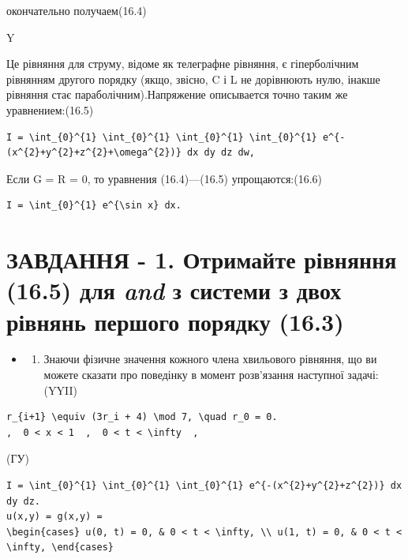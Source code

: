 \documentclass[
  ukrainian,
]{article}
\providecommand{\tightlist}{%
  \setlength{\itemsep}{0pt}\setlength{\parskip}{0pt}}
\begin{document}
окончательно получаем(16.4)

Y

Це рівняння для струму, відоме як телеграфне рівняння, є гіперболічним
рівнянням другого порядку (якщо, звісно, C і L не дорівнюють нулю,
інакше рівняння стає параболічним).Напряжение описывается точно таким же
уравнением:(16.5)

\begin{verbatim}
I = \int_{0}^{1} \int_{0}^{1} \int_{0}^{1} \int_{0}^{1} e^{-(x^{2}+y^{2}+z^{2}+\omega^{2})} dx dy dz dw,
\end{verbatim}

Если G = R = 0, то уравнения (16.4)---(16.5) упрощаются:(16.6)

\begin{verbatim}
I = \int_{0}^{1} e^{\sin x} dx.
\end{verbatim}

\section{\texorpdfstring{ЗАВДАННЯ - 1. Отримайте рівняння (16.5) для
\emph{and} з системи з двох рівнянь першого порядку
(16.3)}{ЗАВДАННЯ - 1. Отримайте рівняння (16.5) для and з системи з двох рівнянь першого порядку (16.3)}}\label{ux437ux430ux432ux434ux430ux43dux43dux44f---1.-ux43eux442ux440ux438ux43cux430ux439ux442ux435-ux440ux456ux432ux43dux44fux43dux43dux44f-16.5-ux434ux43bux44f-and-ux437-ux441ux438ux441ux442ux435ux43cux438-ux437-ux434ux432ux43eux445-ux440ux456ux432ux43dux44fux43dux44c-ux43fux435ux440ux448ux43eux433ux43e-ux43fux43eux440ux44fux434ux43aux443-16.3}

\begin{itemize}
\tightlist
\item
  \begin{enumerate}
  \def\labelenumi{\arabic{enumi}.}
  \setcounter{enumi}{1}
  \tightlist
  \item
    Знаючи фізичне значення кожного члена хвильового рівняння, що ви
    можете сказати про поведінку в момент розв'язання наступної
    задачі:(YYII)
  \end{enumerate}
\end{itemize}

\begin{verbatim}
r_{i+1} \equiv (3r_i + 4) \mod 7, \quad r_0 = 0.
,  0 < x < 1  ,  0 < t < \infty  ,
\end{verbatim}

(ГУ)

\begin{verbatim}
I = \int_{0}^{1} \int_{0}^{1} \int_{0}^{1} e^{-(x^{2}+y^{2}+z^{2})} dx dy dz.
u(x,y) = g(x,y) =
\begin{cases} u(0, t) = 0, & 0 < t < \infty, \\ u(1, t) = 0, & 0 < t < \infty, \end{cases}
\end{verbatim}
\end{document}
